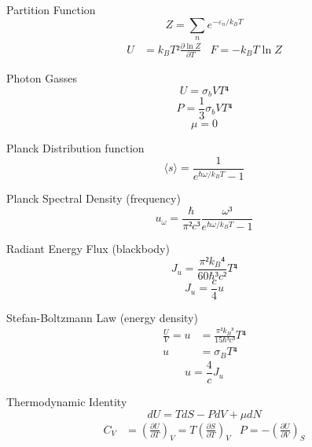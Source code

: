 \documentclass[avery5371]{flashcards}
\begin{document}
\begin{flashcard}{Partition Function}
	\[ Z = \sum_n e^{-ε_n / k_B T} \]
	\begin{align*}
		U &= k_B T² \frac{∂ \ln Z}{∂T}
			& F = -k_B T \ln Z
	\end{align*}
\end{flashcard}

\begin{flashcard}{Photon Gasses}
	\[ U = σ_b VT⁴ \]
	\[ P = \frac 13 σ_b VT⁴ \]
	\[ μ = 0 \]
\end{flashcard}

\begin{flashcard}{Planck Distribution function}
	\[ ⟨s⟩ = \frac{1}{e^{ℏω/k_B T} - 1} \]
\end{flashcard}

\begin{flashcard}{Planck Spectral Density (frequency)}
	\[ u_ω = \frac{ℏ}{π²c³} \frac{ω³}{e^{ℏω/k_B T} - 1} \]
\end{flashcard}

\begin{flashcard}{Radiant Energy Flux (blackbody)}
	\[ J_u = \frac{π²{k_B}⁴}{60ℏ³c²} T⁴ \]
	\[ J_u = \frac{c}{4} u \]
\end{flashcard}

\begin{flashcard}{Stefan-Boltzmann Law (energy density)}
	\begin{align*}
		\frac{U}{V} = u &= \frac{π²{k_B}³}{15ℏ³c³} T⁴ \\
			u &= σ_B T⁴
	\end{align*}
	\[ u = \frac{4}{c} J_u \]
\end{flashcard}

\begin{flashcard}{Thermodynamic Identity}
	\[ dU = T dS - P dV + μ dN \]
	\begin{align*}
		C_V &= (\frac{∂U}{∂T})_V = T (\frac{∂S}{∂T})_V
			& P = -(\frac{∂U}{∂V})_S
	\end{align*}
\end{flashcard}
\end{document}
